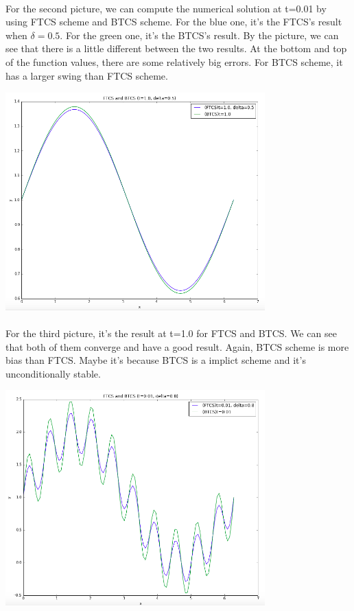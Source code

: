 \documentclass[UTF8]{article}
\begin{document}
\paragraph{}
For the second picture, we can compute the numerical solution at t=0.01 by using FTCS scheme and BTCS scheme. For the blue one, it's the FTCS's result when $\delta = 0.5$. For the green one, it's the BTCS's result. By the picture, we can see that there is a little different between the two results. At the bottom and top of the function values, there are some relatively big errors. For BTCS scheme, it has a larger swing than FTCS scheme.

\includegraphics[width=10cm]{3.png}

\paragraph{}
For the third picture, it's the result at t=1.0 for FTCS and BTCS. We can see that both of them converge and have a good result. Again, BTCS scheme is more bias than FTCS. Maybe it's because BTCS is a implict scheme and it's unconditionally stable.

\includegraphics[width=10cm]{4.png}
\end{document}

